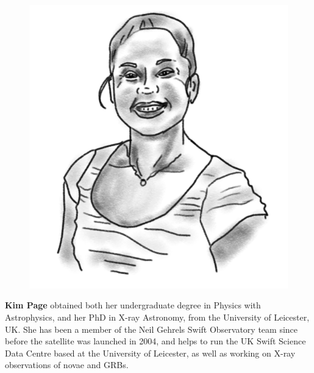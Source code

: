 \begin{figure}
\vspace{-\intextsep}
\includegraphics[width=0.9\linewidth]
{portraits/kim.png}
\end{figure}
\textbf{Kim Page} obtained both her undergraduate degree in Physics with
Astrophysics, and her PhD in X-ray Astronomy, from the University of
Leicester, UK. She has been a member of the Neil Gehrels Swift Observatory
team since before the satellite was launched in 2004, and helps to run the
UK Swift Science Data Centre based at the University of Leicester, as well
as working on X-ray observations of novae and GRBs.\\
\\

